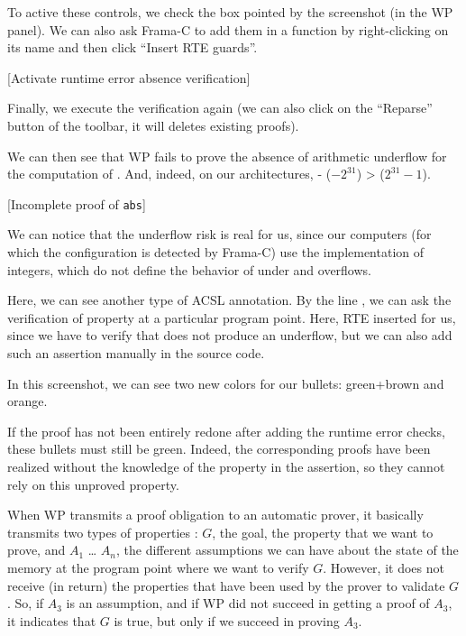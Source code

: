 To active these controls, we check the box pointed by the screenshot (in
the WP panel). We can also ask Frama-C to add them in a function by
right-clicking on its name and then click ``Insert RTE guards''.



[Activate runtime error absence verification]


Finally, we execute the verification again (we can also click on the
``Reparse'' button of the toolbar, it will deletes existing proofs).

We can then see that WP fails to prove the absence of arithmetic
underflow for the computation of . And, indeed, on our
architectures, - ($-2^{31}$) >  ($2^{31}-1$).



[Incomplete proof of \texttt{abs}]


\begin{Information}
We can notice that the underflow risk
is real for us, since our computers (for which the
configuration is detected by Frama-C) use the 
implementation of integers, which do not define
the behavior of under and overflows.
\end{Information}


Here, we can see another type of ACSL annotation. By the line
 , we can ask the verification of
property at a particular program point. Here, RTE inserted for us, since
we have to verify that  does not produce an underflow, but
we can also add such an assertion manually in the source code.



In this screenshot, we can see two new colors for our bullets:
green+brown and orange.



If the proof has not been entirely redone after adding the runtime error
checks, these bullets must still be green. Indeed, the corresponding
proofs have been realized without the knowledge of the property in the
assertion, so they cannot rely on this unproved property.



When WP transmits a proof obligation to an automatic prover, it
basically transmits two types of properties : $G$, the goal, the
property that we want to prove, and $A_1$ \ldots{} $A_n$, the
different assumptions we can have about the state of the memory at the
program point where we want to verify $G$. However, it does not
receive (in return) the properties that have been used by the prover to
validate $G$. So, if $A_3$ is an assumption, and if WP did not
succeed in getting a proof of $A_3$, it indicates that $G$ is true,
but only if we succeed in proving $A_3$.



